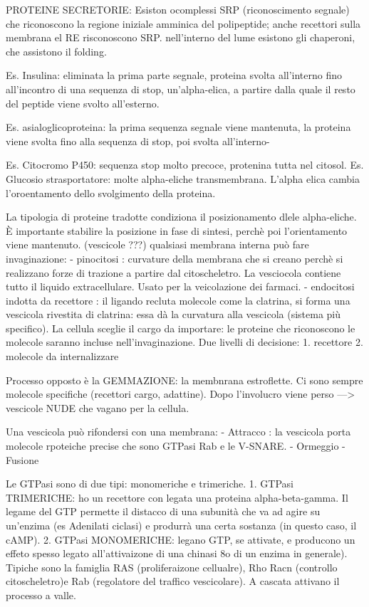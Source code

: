 \documentclass[a4paper,12pt]{article}
\begin{document}
PROTEINE SECRETORIE: 
Esiston ocomplessi SRP (riconoscimento segnale) che riconoscono la regione iniziale amminica del polipeptide; anche recettori sulla membrana el RE risconoscono SRP.
nell'interno del lume esistono gli chaperoni, che assistono il folding.

Es. Insulina: eliminata la prima parte segnale, proteina svolta all'interno fino all'incontro di una sequenza di stop, un'alpha-elica, a partire dalla quale il resto del peptide viene svolto all'esterno.

Es. asialoglicoproteina: la prima sequenza segnale viene mantenuta, la proteina viene svolta fino alla sequenza di stop, poi svolta all'interno-

Es. Citocromo P450: sequenza stop molto precoce, protenina tutta nel citosol.
Es. Glucosio strasportatore: molte alpha-eliche transmembrana. L'alpha elica cambia l'oroentamento dello svolgimento della proteina.

La tipologia di proteine tradotte condiziona il posizionamento dlele alpha-eliche. È importante stabilire la posizione in fase di sintesi, perchè poi l'orientamento viene mantenuto. (vescicole ???)
qualsiasi membrana interna può fare invaginazione:
- pinocitosi : curvature della membrana che si creano perchè si realizzano forze di trazione a partire dal citoscheletro. La vesciocola contiene tutto il liquido extracellulare. Usato per la veicolazione dei farmaci.
- endocitosi indotta da recettore : il ligando recluta molecole come la clatrina, si forma una vescicola rivestita di clatrina: essa dà la curvatura alla vescicola (sistema più specifico). La cellula sceglie il cargo da importare: le proteine che riconoscono le molecole saranno incluse nell'invaginazione. Due livelli di decisione:
1. recettore
2. molecole da internalizzare

Processo opposto è la GEMMAZIONE: la membnrana estroflette. Ci sono sempre molecole specifiche (recettori cargo, adattine). Dopo l'involucro viene perso ---> vescicole NUDE che vagano per la cellula.

Una vescicola può rifondersi con una membrana: 
- Attracco : la vescicola porta molecole rpoteiche precise che sono GTPasi Rab e le V-SNARE.
- Ormeggio
- Fusione

Le GTPasi sono di due tipi: monomeriche e trimeriche.
1. GTPasi TRIMERICHE: ho un recettore con legata una proteina alpha-beta-gamma. Il legame del GTP permette il distacco di una subunità che va ad agire su un'enzima (es Adenilati ciclasi) e produrrà una certa sostanza (in questo caso, il cAMP).
2. GTPasi MONOMERICHE: legano GTP, se attivate, e producono un effeto spesso legato all'attivaizone di una chinasi 8o di un enzima in generale). Tipiche sono la famiglia RAS (proliferaizone cellualre), Rho Racn (controllo citoscheletro)e Rab (regolatore del traffico vescicolare). A cascata attivano il processo a valle.
\end{document}
